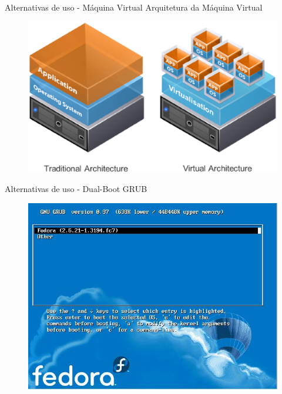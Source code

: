 \documentclass[size=14pt,
style=paintings
]{powerdot}
\begin{document}
\begin{slide}{Alternativas de uso - Máquina Virtual}
Arquitetura da Máquina Virtual
	\centering
	\begin{figure}[!h]
		\includegraphics[scale=0.50]{imagens/slide/traditional-vs-virtualArchitecture}
	\end{figure}
\end{slide}
\begin{slide}{Alternativas de uso - Dual-Boot}
GRUB
	\centering
	\begin{figure}[!h]
		\includegraphics[scale=0.55]{imagens/slide/dualBootFedoraGrub}
	\end{figure}
\end{slide}
\end{document}
